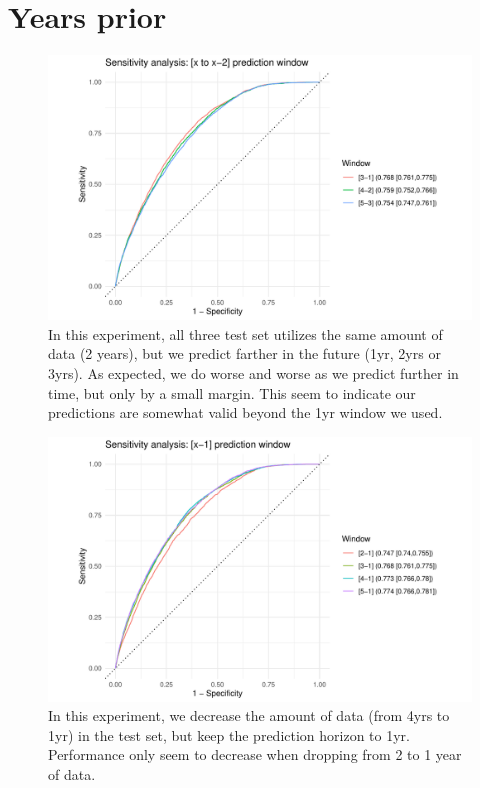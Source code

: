 \documentclass[12pt]{article}
\begin{document}
\clearpage

\section*{Years prior}



\begin{figure}[h]
\centering
\includegraphics[width=1.0\textwidth]{figures/roc_window_2.pdf}
\caption{In this experiment, all three test set utilizes the same amount of data (2 years), 
but we predict farther in the future (1yr, 2yrs or 3yrs). As expected, we do worse and worse
as we predict further in time, but only by a small margin. This seem to indicate our predictions are 
somewhat valid beyond the 1yr window we used.}
\end{figure}



\begin{figure}[h]
\centering
\includegraphics[width=1.0\textwidth]{figures/roc_window_x-1.pdf}
\caption{In this experiment, we decrease the amount of data (from 4yrs to 1yr) in the test set, 
but keep the prediction horizon to 1yr. Performance only seem to decrease when dropping from 2 to 1 year of data.}
\end{figure}
\end{document}
